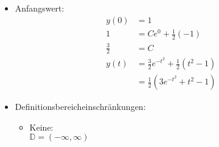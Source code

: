 \documentclass[fleqn,12pt]{scrartcl}
\let\oldsqrt\sqrt
\def\sqrt{\mathpalette\DHLhksqrt}
\def\DHLhksqrt#1#2{%
	\setbox0=\hbox{$#1\oldsqrt{#2\,}$}\dimen0=\ht0
	\advance\dimen0-0.2\ht0
	\setbox2=\hbox{\vrule height\ht0 depth -\dimen0}%
{\box0\lower0.4pt\box2}}
\begin{document}
\begin{itemize}
	\item
		Anfangswert:
		\begin{align*}
			y(0) &= 1\\
			1 &= Ce^{0} +\frac12(-1)\\
			\frac32 &= C\\
			y(t) &= \frac32e^{-t^2} +\frac12(t^2 -1)\\
							 &= \frac12(3e^{-t^2} + t^2 - 1)
		\end{align*}
	\item
		Definitionsbereicheinschränkungen:
		\begin{itemize}
			\item Keine: \\
				$\mathbb{D} = (-\infty, \infty)$
	\end{itemize}


\end{itemize}
\end{document}
